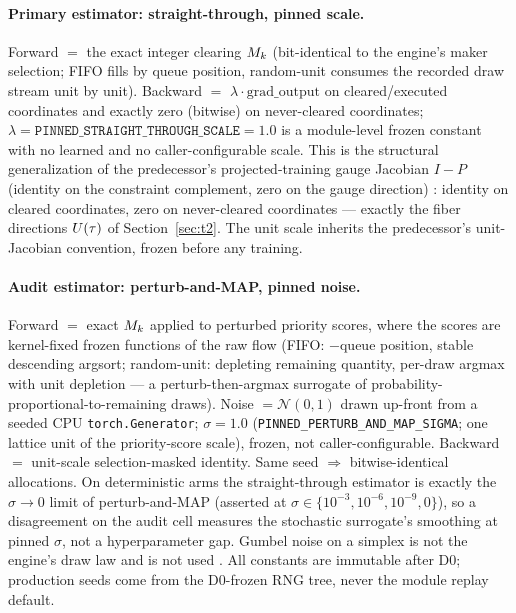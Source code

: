 \paragraph{Primary estimator: straight-through, pinned scale.}
Forward $=$ the exact integer clearing $M_k$ (bit-identical to the engine's
maker selection; FIFO fills by queue position, random-unit consumes the
recorded draw stream unit by unit). Backward $=$ $\lambda \cdot
\mathrm{grad\_output}$ on cleared/executed coordinates and exactly zero
(bitwise) on never-cleared coordinates; $\lambda =
\texttt{PINNED\_STRAIGHT\_THROUGH\_SCALE} = 1.0$ is a module-level frozen
constant with no learned and no caller-configurable scale. This is the
structural generalization of the predecessor's projected-training gauge
Jacobian $I - P$ (identity on the constraint complement, zero on the gauge
direction) \citep{paperd}: identity on cleared coordinates, zero on
never-cleared coordinates --- exactly the fiber directions $U(\tau)$ of
Section~\ref{sec:t2}. The unit scale inherits the predecessor's
unit-Jacobian convention, frozen before any training.

\paragraph{Audit estimator: perturb-and-MAP, pinned noise.}
Forward $=$ exact $M_k$ applied to perturbed priority scores, where the
scores are kernel-fixed frozen functions of the raw flow (FIFO:
$-$queue position, stable descending argsort; random-unit: depleting
remaining quantity, per-draw argmax with unit depletion --- a
perturb-then-argmax surrogate \citep{perturbargmax2024} of
probability-proportional-to-remaining draws). Noise $= \mathcal{N}(0,1)$ drawn up-front from a
seeded CPU \texttt{torch.Generator}; $\sigma = 1.0$
(\texttt{PINNED\_PERTURB\_AND\_MAP\_SIGMA}; one lattice unit of the
priority-score scale), frozen, not caller-configurable. Backward $=$
unit-scale selection-masked identity. Same seed $\Rightarrow$ bitwise-identical
allocations. On deterministic arms the straight-through estimator is exactly
the $\sigma \to 0$ limit of perturb-and-MAP (asserted at $\sigma \in
\{10^{-3}, 10^{-6}, 10^{-9}, 0\}$), so a disagreement on the audit cell
measures the stochastic surrogate's smoothing at pinned $\sigma$, not a
hyperparameter gap. Gumbel noise on a simplex is not the engine's draw law and
is not used \citep{gumbelsoftmax2016}. All constants are immutable after D0;
production seeds come from the D0-frozen RNG tree, never the module replay
default.

